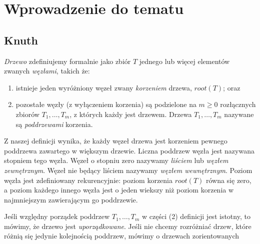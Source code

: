 \chapter{Wprowadzenie do tematu}



\section{Knuth}

\emph{Drzewo} zdefiniujemy formalnie jako zbiór $T$ jednego lub więcej elementów zwanych \emph{węzłami}, takich że:

\begin{enumerate}
 \item istnieje jeden wyróżniony węzeł zwany \emph{korzeniem} drzewa, $root(T)$; oraz
 \item pozostałe węzły (z wyłączeniem korzenia) są podzielone na $m \geq 0$ rozłącznych zbiorów $T_{1},\ldots, T_{m}$,
	z których każdy jest drzewem. Drzewa $T_{1},\ldots, T_{m}$ nazywane są \emph{poddrzewami} korzenia.
\end{enumerate}

Z naszej definicji wynika, że każdy węzeł drzewa jest korzeniem pewnego poddrzewa zawartego w większym drzewie.
Liczna poddrzew węzła jest nazywana stopniem tego węzła.
Węzeł o stopniu zero nazywamy \emph{liściem} lub \emph{węzłem zewnętrznym}. 
Węzeł nie będący liściem nazywamy \emph{węzłem wewnętrznym}. 
Poziom węzła jest zdefiniowany rekurencyjnie: poziom korzenia $root(T)$ równa się zero,
a poziom każdego innego węzła jest o jeden wiekszy niż poziom korzenia w najmniejszym 
 zawierającym go poddrzewie.




Jeśli względny porządek poddrzew $T_{1},\ldots, T_{m}$ w części (2) definicji jest istotny,
to mówimy, że drzewo jest \emph{uporządkowane}. 
Jeśli nie chcemy rozróżniać drzew, które różnią się jedynie kolejnością poddrzew, mówimy o drzewach zorientowanych

